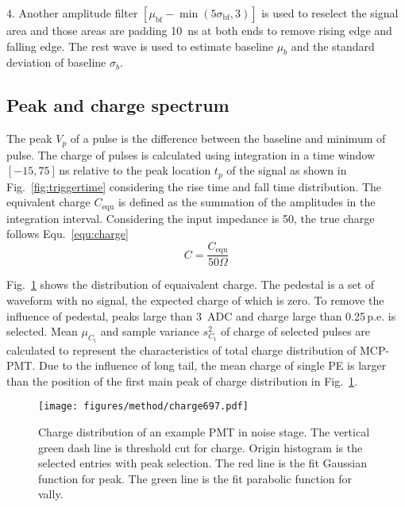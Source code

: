 4. Another amplitude filter $[\mu_{\mathrm{bf}}-\min(5\sigma_{\mathrm{bf}},3)]$ is used to reselect the signal area and those areas are padding \SI{10}{ns} at both ends to remove rising edge and falling edge. The rest wave is used to estimate baseline $\mu_b$ and the standard deviation of baseline $\sigma_b$.

\subsection{Peak and charge spectrum}
\label{sec:noisepeak}

The peak $V_p$ of a pulse is the difference between the baseline and minimum of pulse. The charge of pulses is calculated using integration in a time window $[-15, 75]$\,ns relative to the peak location $t_p$ of the signal as shown in Fig.~\ref{fig:triggertime} considering the rise time and fall time distribution. The equivalent charge $C_{\mathrm{equ}}$ is defined as the summation of the amplitudes in the integration interval. Considering the input impedance is \SI{50}{\Omega}, the true charge follows Equ.~\eqref{equ:charge} 
\begin{equation}
    \label{equ:charge}
    C = \frac{C_{\mathrm{equ}}}{50 \Omega}
\end{equation}

Fig.~\ref{fig:charge} shows the distribution of equaivalent charge. The pedestal is a set of waveform with no signal, the expected charge of which is zero. To remove the influence of pedestal, peaks large than \SI{3}{ADC} and charge large than 0.25\,p.e. is selected. Mean $\mu_{C_{\mathrm{t}}}$ and sample variance $s^2_{C_{\mathrm{t}}}$ of charge of selected pulses are calculated to represent the characteristics of total charge distribution of MCP-PMT. Due to the influence of long tail, the mean charge of single PE is larger than the position of the first main peak of charge distribution in Fig.~\ref{fig:charge}.
\begin{figure}[!htbp]
    \centering
    \texttt{[image: figures/method/charge697.pdf]}
    \caption{Charge distribution of an example PMT in noise stage. The vertical green dash line is threshold cut for charge. Origin histogram is the selected entries with peak selection. The red line is the fit Gaussian function for peak. The green line is the fit parabolic function for vally.}
    \label{fig:charge}
\end{figure}

